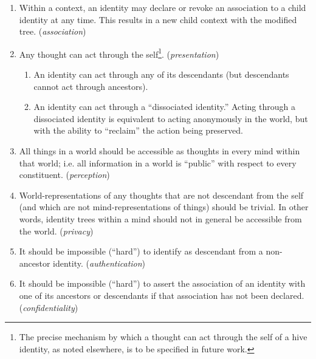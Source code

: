 \documentclass[pra,twocolumn,groupedaddress,10pt]{revtex4}
\theoremstyle{definition}
\begin{document}
\begin{enumerate}

\item Within a context, an identity may declare or revoke an association to a child identity at any time. This results in a new child context with the modified tree. (\emph{association})

\item Any thought can act through the self\footnote{The precise mechanism by which a thought can act through the self of a hive identity, as noted elsewhere, is to be specified in future work.}. (\emph{presentation})
	\begin{enumerate}
		\item An identity can act through any of its descendants (but descendants cannot act through ancestors).
		\item An identity can act through a ``dissociated identity.'' Acting through a dissociated identity is equivalent to acting anonymously in the world, but with the ability to ``reclaim'' the action being preserved.
	\end{enumerate}

\item All things in a world should be accessible as thoughts in every mind within that world; i.e. all information in a world is ``public'' with respect to every constituent. (\emph{perception})

\item World-representations of any thoughts that are not descendant from the self (and which are not mind-representations of things) should be trivial. In other words, identity trees within a mind should not in general be accessible from the world. (\emph{privacy})

\item It should be impossible (``hard'') to identify as descendant from a non-ancestor identity. (\emph{authentication})

\item It should be impossible (``hard'') to assert the association of an identity with one of its ancestors or descendants if that association has not been declared. (\emph{confidentiality})

\end{enumerate}
\end{document}
